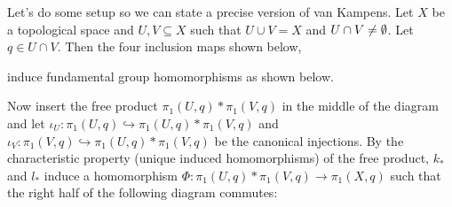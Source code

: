 Let's do some setup so we can state a precise version of van Kampens. Let $X$ be a topological space and $U,V\subseteq X$ such that $U \cup V=X$ and $U\cap V\neq \emptyset$. Let $q\in U\cap V$. Then the four inclusion maps shown below,
            \begin{figure}[H]
                \centering
            \end{figure}
            induce fundamental group homomorphisms as shown below.
                        \begin{figure}[H]
                \centering
            \end{figure}
            Now insert the free product $\pi_1(U,q)*\pi_1(V,q)$ in the middle of the diagram and let $\iota_U \colon \pi_1(U,q) \hookrightarrow \pi_1(U,q)*\pi_1(V,q)$ and $\iota_V \colon \pi_1(V,q) \hookrightarrow \pi_1(U,q)*\pi_1(V,q)$ be the canonical injections. By the characteristic property (unique induced homomorphisms) of the free product, $k_*$ and $l_*$ induce a homomorphism $\Phi \colon \pi_1(U,q)*\pi_1(V,q) \to \pi_1(X,q)$ such that the right half of the following diagram commutes:

